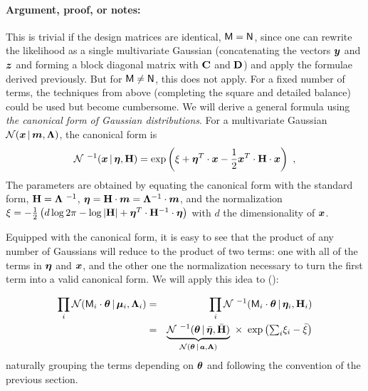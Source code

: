 \paragraph{Argument, proof, or notes:}

This is trivial if the design matrices are identical, $\mathsf{M} = \mathsf{N}$, since one can rewrite the likelihood as a single multivariate Gaussian (concatenating the vectors $\boldsymbol{y}$ and $\boldsymbol{z}$ and forming a block diagonal matrix with $\mathbf{C}$ and $\mathbf{D}$) and apply the formulae derived previously. But for $\mathsf{M} \neq \mathsf{N}$, this does not apply. For a fixed number of terms, the techniques from above (completing the square and detailed balance) could be used but become cumbersome. We will derive a general formula using \textit{the canonical form of Gaussian distributions}.
For a multivariate Gaussian $\mathcal{N}\!\,(\boldsymbol{x}\,|\,\boldsymbol{m},\mathbf{\Lambda})$, the canonical form is
\begin{equation}
\normal^{\ -1}(\vx\given\veta, \tH) = \exp\left(\xi +  \veta^T\cdot\vx - \frac{1}{2}\vx^T \cdot\tH \cdot \vx\right)
~ ,
\end{equation}
The parameters are obtained by equating the canonical form with the standard form, $\tH = \tLambda^{\ -1}$, $\boldsymbol{\eta} = \mathbf{H}\cdot \boldsymbol{m} = \mathbf{\Lambda}^{-1}\cdot \boldsymbol{m}$, and the normalization
$\xi = -\frac{1}{2}\left( d\log 2\pi -\log|\mathbf{H}| + \boldsymbol{\eta}^T \cdot \mathbf{H}^{-1}\cdot \boldsymbol{\eta} \right)$
with $d$ the dimensionality of $\boldsymbol{x}$.

Equipped with the canonical form, it is easy to see that the product of any number of Gaussians will reduce to the product of two terms: one with all of the terms in $\boldsymbol{\eta}$ and $\boldsymbol{x}$, and the other one the normalization necessary to turn the first term into a valid canonical form. We will apply this idea to ():

\begin{eqnarray}
\prod_i \normal( \mM_i\cdot\vtheta \given \vmu_i,\tLambda_i) &=& \prod_i \normal^{\ -1}( \mM_i\cdot\vtheta\given\veta_i, \tH_i) \\
&=&   \underbrace{\normal^{\ -1}(\vtheta\given\bar{\veta}, \bar{\tH})}_{ \normal(\vtheta\given\va,\tA) } \ \times \ \exp\left(\textstyle{\sum_i} \xi_i - \bar{\xi} \right)
\end{eqnarray}
naturally grouping the terms depending on $\boldsymbol{\theta}$ and following the convention of the previous section.


